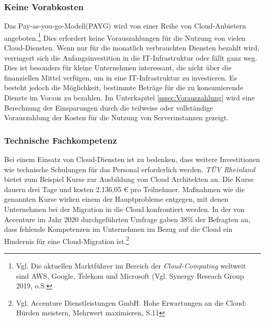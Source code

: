 \subsubsection{Keine Vorabkosten}
Das Pay-as-you-go-Modell(PAYG) wird von einer Reihe von Cloud-Anbietern angeboten.\footnote{Vgl.  Die aktuellen Marktführer im Bereich der \textit{Cloud-Computing} weltweit sind AWS, Google, Telekom und Microsoft (Vgl. Synergy Reseach Group 2019, o.S.\cite{STA6}} Dies erfordert keine Vorauszahlungen für die Nutzung von vielen Cloud-Diensten. Wenn nur für die monatlich verbrauchten Diensten bezahlt wird, verringert sich die Anfangsinvestition in die IT-Infrastruktur oder fällt ganz weg. Dies ist besonders für kleine Unternehmen interessant, die nicht über die finanziellen Mittel verfügen, um in eine IT-Infrastruktur zu investieren. Es besteht jedoch die Möglichkeit, bestimmte Beträge für die zu konsumierende Dienste im Voraus zu bezahlen. Im Unterkapitel \ref{sssec:Vorauszahlung} wird eine Berechnung der Einsparungen durch die teilweise oder vollständige Vorauszahlung der Kosten für die Nutzung von Serverinstanzen gezeigt.  

\subsubsection{Technische Fachkompetenz}
Bei einem Einsatz von Cloud-Diensten ist zu bedenken, dass weitere Investitionen wie technische Schulungen für das Personal erforderlich werden. \textit{TÜV Rheinland} bietet zum Beispiel Kurse zur Ausbildung von Cloud Architekten an. Die Kurse dauern drei Tage und kosten 2.136,05 € pro Teilnehmer. Maßnahmen wie die genannten Kurse wirken einem der Hauptprobleme entgegen, mit denen Unternehmen bei der Migration in die Cloud konfrontiert werden. In der von Accenture im Jahr 2020 durchgeführten Umfrage gaben 38\% der Befragten an, dass fehlende Kompetenzen im Unternehmen im Bezug auf die Cloud ein Hindernis für eine Cloud-Migration ist.\footnote{Vgl. Accenture Dienstleistungen GmbH. Hohe Erwartungen an die Cloud: Hürden
meistern, Mehrwert maximieren, S.11\cite{ACC1}}

